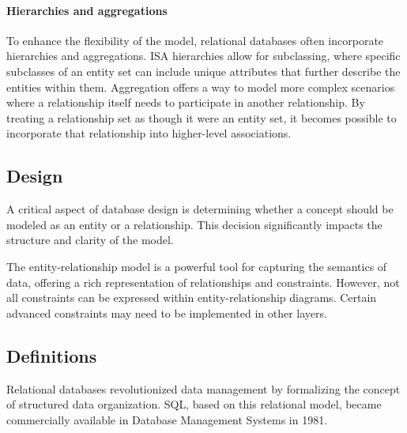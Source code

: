 \paragraph*{Hierarchies and aggregations}
To enhance the flexibility of the model, relational databases often incorporate hierarchies and aggregations. 
ISA hierarchies allow for subclassing, where specific subclasses of an entity set can include unique attributes that further describe the entities within them. 
Aggregation offers a way to model more complex scenarios where a relationship itself needs to participate in another relationship. 
By treating a relationship set as though it were an entity set, it becomes possible to incorporate that relationship into higher-level associations.

\subsection{Design}
A critical aspect of database design is determining whether a concept should be modeled as an entity or a relationship.
This decision significantly impacts the structure and clarity of the model.

The entity-relationship model is a powerful tool for capturing the semantics of data, offering a rich representation of relationships and constraints.
However, not all constraints can be expressed within entity-relationship diagrams. Certain advanced constraints may need to be implemented in other layers.

\subsection{Definitions}
Relational databases revolutionized data management by formalizing the concept of structured data organization. 
SQL, based on this relational model, became commercially available in Database Management Systems in 1981.

